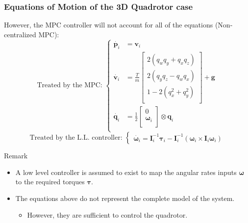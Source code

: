 \documentclass{thesisbeamer}
\newcommand\Fontvi{\fontsize{9}{10}\selectfont}
\begin{document}
\begin{frame}
	\frametitle{Equations of Motion of the 3D Quadrotor case}
	\Fontvi
	
	However, the MPC controller will not account for all of the equations (Non-centralized MPC):
	$$
		\text{Treated by the MPC: }\left\{
		\begin{array}{lll}				
			\dot{\bm{p}_i} &= \bm{v}_i \\
			\dot{\bm{v}_i} &= 
			\frac{T}{m} 
			\begin{bmatrix}
				2 (q_w q_y + q_x q_z) \\
				2 (q_y q_z - q_w q_x) \\
				1 - 2(q_x^2 + q_y^2 ) \\
			\end{bmatrix} + \bm{g} \\			
			\dot{\bm{q}_i} & = \frac{1}{2}
			\begin{bmatrix}
				0 \\
				\bm{\omega}_i \\
			\end{bmatrix} \otimes \bm{q}_i \\
		\end{array}
		\right.
	$$
	$$
			\text{Treated by the L.L. controller: }\left\{
			\begin{array}{l}	
				\dot{\bm{\omega}_i} = \bm{I}_i^{-1} \bm{\tau}_i - \bm{I}_i^{-1} (\bm{\omega}_i \times \bm{I}_i \bm{\omega}_i)
			\end{array}
			\right.
	$$

	\begin{alertblock}{Remark}
		\begin{itemize} %
			\item A low level controller is assumed to exist to map the angular rates inputs $\bm{\omega}$ to the required torques $\bm{\tau}$. 
			\item The equations above do not represent the complete model of the system.
			\begin{itemize}
				\item However, they are sufficient to control the quadrotor.
			\end{itemize}
		\end{itemize}
	\end{alertblock}						
				
\end{frame}
\end{document}
